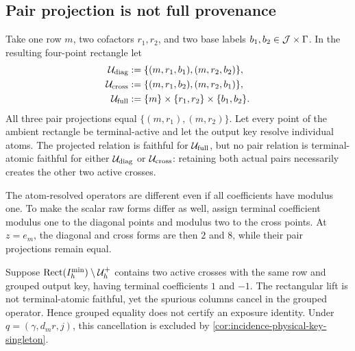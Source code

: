 \subsection{Pair projection is not full provenance}

\begin{example}
\label{ex:completion-same-pair-different-incidence}
Take one row \(m\), two cofactors \(r_1,r_2\), and two base labels
\(b_1,b_2\in\mathcal J\times\Gamma\).  In the resulting four-point rectangle let
\begin{align}
 \mathcal U_{\mathrm{diag}}
 &:=\{(m,r_1,b_1),(m,r_2,b_2)\},
 \label{eq:completion-diagonal-incidence}\\
 \mathcal U_{\mathrm{cross}}
 &:=\{(m,r_1,b_2),(m,r_2,b_1)\},
 \label{eq:completion-cross-incidence}\\
 \mathcal U_{\mathrm{full}}
 &:=\{m\}\times\{r_1,r_2\}\times\{b_1,b_2\}.
 \label{eq:completion-full-incidence}
\end{align}
All three pair projections equal
\(\{(m,r_1),(m,r_2)\}\).  Let every point of the ambient rectangle be
terminal-active and let the output key resolve individual atoms.  The
projected relation is faithful for \(\mathcal U_{\mathrm{full}}\), but no pair
relation is terminal-atomic faithful for either
\(\mathcal U_{\mathrm{diag}}\) or \(\mathcal U_{\mathrm{cross}}\): retaining both actual
pairs necessarily creates the other two active crosses.

The atom-resolved operators are different even if all coefficients have
modulus one.  To make the scalar raw forms differ as well, assign terminal
coefficient modulus one to the diagonal points and modulus two to the
cross points.  At \(z=e_m\), the diagonal and cross forms are then \(2\)
and \(8\), while their pair projections remain equal.
\end{example}

\begin{example}
\label{ex:completion-grouped-concealment}
Suppose
\(\operatorname{Rect}(I_h^{\min})\setminus\mathcal U_h^+\) contains two active crosses with the
same row and grouped output key, having terminal coefficients \(1\) and
\(-1\).  The rectangular lift is not terminal-atomic faithful, yet the
spurious columns cancel in the grouped operator.  Hence grouped equality
does not certify an exposure identity.  Under
\(q=(\gamma,d_mr,j)\), this cancellation is excluded by
\cref{cor:incidence-physical-key-singleton}.
\end{example}

